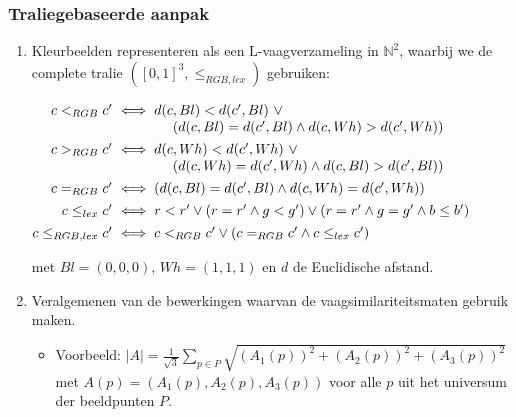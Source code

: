 \documentclass[dutch]{beamer}
\theoremstyle{definition}
\theoremstyle{remark}
\theoremstyle{example}
\begin{document}
{
  \frametitle{Traliegebaseerde aanpak}

  \begin{enumerate}
  \item Kleurbeelden representeren als een L-vaagverzameling in $\mathbb{N}^2$,
  waarbij we de complete tralie $([0,1]^3, \le_{RGB,lex})$ gebruiken:
  \begin{minipage}{\textwidth}
  \vspace{7pt}
  \scriptsize
  \centering
  $\begin{array}{@{}r@{}l@{}}
   c <_{RGB} c' & \ \iff d(c,Bl) < d(c',Bl)\ \lor \\
			 & \ \qquad \qquad (d(c,Bl) = d(c',Bl) \land d(c,Wh) > d(c',Wh)) \\[4pt]
   c >_{RGB} c' & \ \iff d(c,Wh) < d(c',Wh)\ \lor \\
			 & \ \qquad \qquad (d(c,Wh) = d(c',Wh) \land d(c,Bl) > d(c',Bl)) \\[4pt]
   c =_{RGB} c' & \ \iff (d(c,Bl) = d(c',Bl) \land d(c,Wh) = d(c',Wh)) \\[4pt]
   c \leq_{lex} c' & \ \iff r < r' \lor (r = r' \land g < g') \lor (r = r' \land g = g' \land b \leq b') \\[4pt]
   c \leq_{RGB,lex} c' & \ \iff c <_{RGB} c' \lor (c =_{RGB} c' \land c \leq_{lex} c')
  \end{array}$
  \vspace{7pt}
  \end{minipage}
  met $Bl = (0,0,0)$, $Wh = (1,1,1)$ en $d$ de Euclidische afstand.
  \item Veralgemenen van de bewerkingen waarvan de vaagsimilariteitsmaten gebruik maken.
  \begin{itemize}
    \item Voorbeeld: $|A|=\frac{1}{\sqrt{3}}\sum_{p \in P}\sqrt{(A_1(p))^2+(A_2(p))^2+(A_3(p))^2}$
    met $A(p)=(A_1(p),A_2(p),A_3(p))$ voor alle $p$ uit het universum der beeldpunten $P$.
  \end{itemize}
  \end{enumerate}
}
\end{document}
